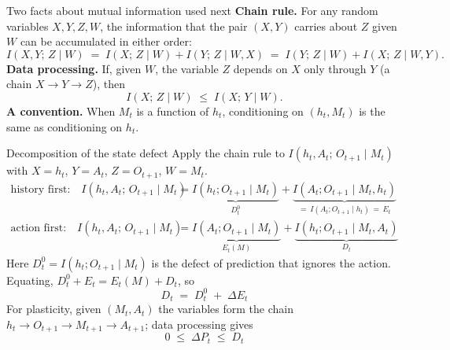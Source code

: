 \documentclass[11pt,aspectratio=169]{beamer}
\newcommand{\dE}{\Delta E}
\newcommand{\dP}{\Delta P}
\begin{document}
\begin{frame}{Two facts about mutual information used next}
\textbf{Chain rule.} For any random variables $X, Y, Z, W$, the information that the pair $(X, Y)$ carries about $Z$ given $W$ can be accumulated in either order:
\[
I(X, Y;\, Z \mid W) \;=\; I(X;\, Z \mid W) + I(Y;\, Z \mid W, X) \;=\; I(Y;\, Z \mid W) + I(X;\, Z \mid W, Y).
\]
\vspace{1mm}
\textbf{Data processing.} If, given $W$, the variable $Z$ depends on $X$ only through $Y$ (a chain $X \to Y \to Z$), then
\[
I(X;\, Z \mid W) \;\le\; I(X;\, Y \mid W).
\]
\vspace{1mm}
\textbf{A convention.} When $M_t$ is a function of $h_t$, conditioning on $(h_t, M_t)$ is the same as conditioning on $h_t$.
\end{frame}

\begin{frame}{Decomposition of the state defect}
Apply the chain rule to $I(h_t, A_t;\, O_{t+1} \mid M_t)$ with $X = h_t$, $Y = A_t$, $Z = O_{t+1}$, $W = M_t$.
\begin{align*}
\text{history first:}\quad I(h_t, A_t;\, O_{t+1} \mid M_t) &= \underbrace{I(h_t; O_{t+1} \mid M_t)}_{D^0_t} + \underbrace{I(A_t; O_{t+1} \mid M_t, h_t)}_{=\,I(A_t; O_{t+1} \mid h_t)\,=\,E_t} \\[1mm]
\text{action first:}\quad I(h_t, A_t;\, O_{t+1} \mid M_t) &= \underbrace{I(A_t; O_{t+1} \mid M_t)}_{E_t(M)} + \underbrace{I(h_t; O_{t+1} \mid M_t, A_t)}_{D_t}
\end{align*}
Here $D^0_t = I(h_t; O_{t+1} \mid M_t)$ is the defect of prediction that ignores the action. Equating, $D^0_t + E_t = E_t(M) + D_t$, so
\[
\boxed{\;D_t \;=\; D^0_t \;+\; \dE_t\;}
\]
For plasticity, given $(M_t, A_t)$ the variables form the chain $h_t \to O_{t+1} \to M_{t+1} \to A_{t+1}$; data processing gives
\[
\boxed{\;0 \;\le\; \dP_t \;\le\; D_t\;}
\]
\end{frame}
\end{document}
